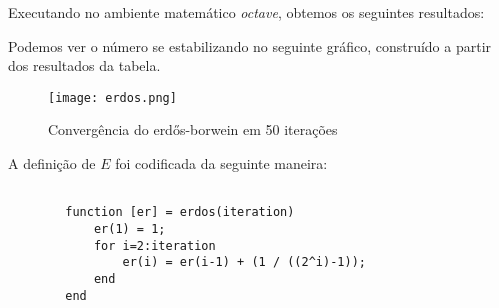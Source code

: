		Executando no ambiente matemático \emph{octave}, obtemos os seguintes
		resultados:

		

		Podemos ver o número se estabilizando no seguinte gráfico,
		construído a partir dos resultados da tabela.

		\begin{figure}[H]
			\centering
			\texttt{[image: erdos.png]}
			\caption{Convergência do erdős-borwein em 50 iterações}
			\label{erdos_graphic}
		\end{figure}

		A definição de $E$ foi codificada da seguinte maneira:

		\begin{lstlisting}

		function [er] = erdos(iteration)
			er(1) = 1;
			for i=2:iteration
				er(i) = er(i-1) + (1 / ((2^i)-1));
			end
		end

		\end{lstlisting}
